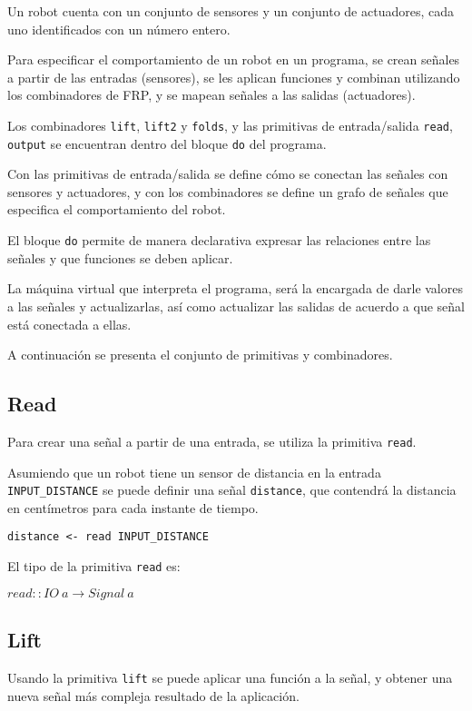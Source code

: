 
  Un robot cuenta con un conjunto de sensores y un conjunto de actuadores,
cada uno identificados con un número entero.

  Para especificar el comportamiento de un robot en un programa, se crean
señales a partir de las entradas (sensores), se les aplican funciones
y combinan utilizando los combinadores de FRP, y se mapean señales
a las salidas (actuadores).

  Los combinadores \texttt{lift}, \texttt{lift2} y \texttt{folds},
y las primitivas de entrada/salida \texttt{read}, \texttt{output} se
encuentran dentro del bloque \texttt{do} del programa.

  Con las primitivas de entrada/salida se define cómo se conectan
las señales con sensores y actuadores, y con los combinadores se
define un grafo de señales que especifica el comportamiento del robot.

  El bloque \texttt{do} permite de manera declarativa expresar las
relaciones entre las señales y que funciones se deben aplicar.

  La máquina virtual que interpreta el programa, será la encargada de
darle valores a las señales y actualizarlas, así como actualizar las
salidas de acuerdo a que señal está conectada a ellas.

  A continuación se presenta el conjunto de primitivas y combinadores.

\subsection{Read}
  Para crear una señal a partir de una entrada, se utiliza la
primitiva \texttt{read}.

  Asumiendo que un robot tiene un sensor de distancia en la entrada
\texttt{INPUT\_DISTANCE} se puede definir una señal \texttt{distance},
que contendrá la distancia en centímetros para cada instante de tiempo.

\begin{center}
\begin{Verbatim}[frame=single]
distance <- read INPUT_DISTANCE
\end{Verbatim}
\end{center}

El tipo de la primitiva \texttt{read} es:

\begin{center}
  $read :: IO\ a \rightarrow Signal\ a $
\end{center}

\subsection{Lift}
  Usando la primitiva \texttt{lift} se puede aplicar una función
a la señal, y obtener una nueva señal más compleja resultado de la
aplicación.


